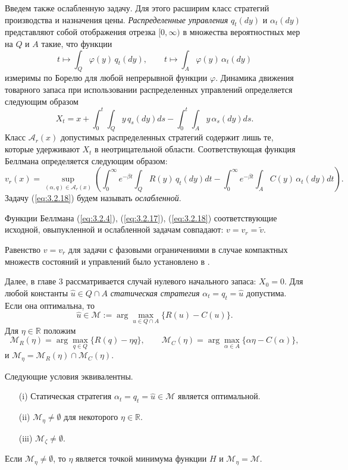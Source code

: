 Введем также ослабленную задачу. Для этого расширим класс стратегий производства и назначения цены. \emph{Распределенные управления} $q_t(dy)$ и $\alpha_t(dy)$ представляют собой отображения отрезка $[0,\infty)$ в множества вероятностных мер на $Q$ и $A$ такие, что функции
$$ t\mapsto\int_Q\varphi(y)\,q_t(dy),\qquad t\mapsto\int_A\varphi(y)\,\alpha_t(dy)$$
измеримы по Борелю для любой непрерывной функции $\varphi$. Динамика движения товарного запаса при использовании распределенных управлений определяется следующим образом
$$ X_t=x+\int_0^t\int_Q y\,q_s(dy)ds-\int_0^t\int_A y\,\alpha_s(dy)ds.$$
Класс $\mathscr A_r(x)$ допустимых распределенных стратегий содержит лишь те, которые удерживают $X_t$ в неотрицательной области. Соответствующая функция Беллмана определяется следующим образом:
\begin{equation} \label{eq:3.2.18}
v_r(x)=\sup_{(\alpha,q)\in\mathscr A_r(x)}\left(\int_0^\infty e^{-\beta t}\int_Q R(y)\,q_t(dy)dt -\int_0^\infty e^{-\beta t} \int_A C(y)\,\alpha_t(dy)dt\right).
\end{equation}
Задачу (\ref{eq:3.2.18}) будем называть \emph{ослабленной}.

\begin{theorem} \label{th:3.2}
Функции Беллмана (\ref{eq:3.2.4}), (\ref{eq:3.2.17}), (\ref{eq:3.2.18}) соответствующие исходной, овыпукленной и ослабленной задачам совпадают:
$v=v_r=\widetilde v.$
\end{theorem}

Равенство $v=v_r$ для задачи с фазовыми ограничениями в случае компактных множеств состояний и управлений было установлено в \cite{Lor87}.

Далее, в главе 3 рассматривается случай нулевого начального запаса: $X_0=0$. Для любой константы $\widehat u\in Q\cap A$ \emph{статическая стратегия} $\alpha_t=q_t= \widehat u$ допустима. Если она оптимальна, то
\begin{equation} \label{eq:3.3.1}
\widehat u\in\mathscr M:=\arg\max_{u\in Q\cap A}\{R(u)-C(u)\}.
\end{equation}
Для $\eta\in\mathbb R$ положим
$$\mathscr M_R(\eta)=\arg\max_{q\in Q}\{R(q)-\eta q\},\qquad
\mathscr M_C(\eta)=\arg\max_{\alpha\in A}\{\alpha\eta-C(\alpha)\},$$
и $\mathscr M_\eta=\mathscr M_R(\eta)\cap\mathscr M_C(\eta)$.
\begin{theorem} \label{th:3.3}
Следующие условия эквивалентны.
\begin{itemize}
\item[(i)] Статическая стратегия $\alpha_t=q_t= \widehat u\in\mathscr M$ является оптимальной.
\item[(ii)] $\mathscr M_\eta\neq\emptyset$ для некоторого $\eta\in\mathbb R$.
\item[(iii)] $\mathscr M_\zeta\neq\emptyset$.
\end{itemize}
Если $\mathscr M_\eta\neq\emptyset$, то $\eta$ является точкой минимума функции $H$ и $\mathscr M_\eta=\mathscr M$.
\end{theorem}

